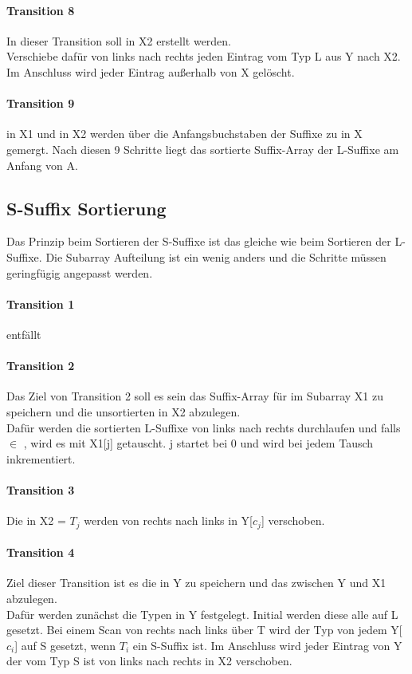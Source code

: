 \paragraph{Transition 8}
In dieser Transition soll \SAlx in X2 erstellt werden.\\
Verschiebe dafür von links nach rechts jeden Eintrag vom Typ L aus Y nach X2. Im Anschluss wird jeder Eintrag außerhalb von X gelöscht.
\paragraph{Transition 9}
\SAlx in X1 und \SAlxnot in X2 werden über die Anfangsbuchstaben der Suffixe zu \SAl in X gemergt.
\bigskip
Nach diesen 9 Schritte liegt das sortierte Suffix-Array der L-Suffixe am Anfang von A.
\subsection{S-Suffix Sortierung}
Das Prinzip beim Sortieren der S-Suffixe ist das gleiche wie beim Sortieren der L-Suffixe. Die Subarray Aufteilung ist ein wenig anders und die Schritte müssen geringfügig angepasst werden.
\paragraph{Transition 1}
entfällt
\paragraph{Transition 2}
Das Ziel von Transition 2 soll es sein das Suffix-Array für \lxnot  im Subarray X1 zu speichern und die unsortierten \lx  in X2 abzulegen.\\
Dafür werden die sortierten L-Suffixe von links nach rechts durchlaufen und falls \SAl [i] $\in$ \lxnot , wird es mit X1[j] getauscht. j startet bei 0 und wird bei jedem Tausch inkrementiert.
\paragraph{Transition 3}
Die \lx in X2 = $T_{j}$ werden von rechts nach links in Y[$c_{j}$] verschoben.
\paragraph{Transition 4}
Ziel dieser Transition ist es die \ly in Y zu speichern und das \SAlxlynot zwischen Y und X1 abzulegen.\\
Dafür werden zunächst die Typen in Y festgelegt. Initial werden diese alle auf L gesetzt. Bei einem Scan von rechts nach links über T wird der Typ  von jedem Y[$c_{i}$] auf S gesetzt, wenn $T_{i}$ ein S-Suffix ist. Im   Anschluss wird jeder Eintrag von Y der vom Typ S ist von links nach    rechts in X2 verschoben.
